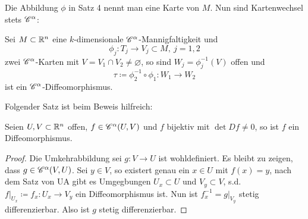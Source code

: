 Die Abbildung $\phi$ in Satz 4 nennt man eine Karte von $M$. Nun sind Kartenwechsel stets $\mathscr{C}^\alpha$:
\begin{satz}
    Sei $M\subset \mathbb{R}^n$ eine $k$-dimensionale $\mathscr{C}^\alpha$-Mannigfaltigkeit und 
    \[
    \phi_j : T_j \to V_j\subset M,\ j=1,2    
    \]
    zwei $\mathscr{C}^\alpha$-Karten mit $V=V_1\cap V_2\neq \varnothing$, so sind $W_j = \phi_j^{-1}(V)$ offen und 
    \[
    \tau \coloneqq \phi_2^{-1}\circ \phi_1 : W_1\to W_2    
    \]
    ist ein $\mathscr{C}^\alpha$-Diffeomorphismus.
\end{satz}
Folgender Satz ist beim Beweis hilfreich: 
\begin{lemma}
    Seien $U,V\subset \mathbb{R}^n$ offen, $f\in \mathscr{C}^\alpha(U,V)$ und $f$ bijektiv mit $\det Df \neq 0$, so ist $f$ ein Diffeomorphismus.
\end{lemma}
\begin{proof}
    Die Umkehrabbildung sei $g:V\to U$ ist wohldefiniert. Es bleibt zu zeigen, dass $g\in \mathscr{C}^\alpha(V,U)$. Sei $y\in V$, so existert genau ein $x\in U$ mit $f(x)=y$, nach dem Satz von UA gibt es Umgegbungen $U_x\subset U$ und $V_y\subset V$, s.d. $f\vert_{U_x}\coloneqq f_x:U_x\to V_y$ ein Diffeomorphismus ist. Nun ist
    $f_x^{-1}=g\vert_{V_y}$ stetig differenzierbar. Also ist $g$ stetig differenzierbar.  
\end{proof}
\newpage

